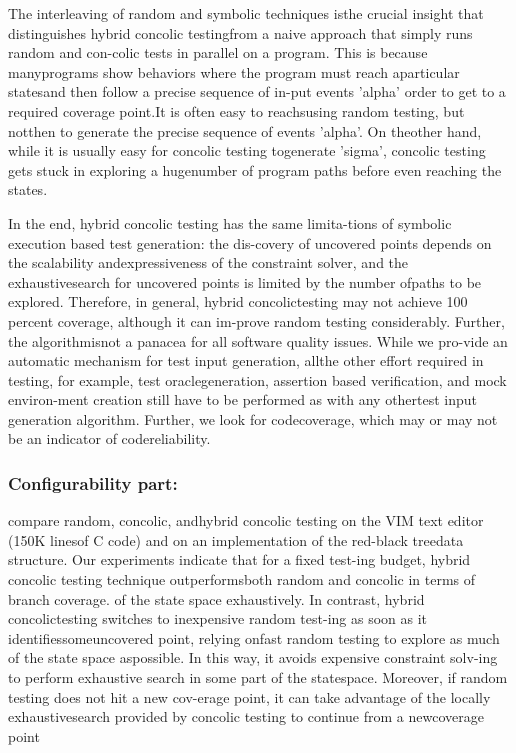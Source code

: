 \documentclass[	runningheads,
				a4paper]{llncs}
\begin{document}
The interleaving of random and symbolic techniques isthe crucial insight that distinguishes hybrid concolic testingfrom a naive approach that simply runs random and con-colic tests in parallel on a program.  This is because manyprograms show behaviors where the program must reach aparticular statesand then follow a precise sequence of in-put events 'alpha' order to get to a required coverage point.It  is  often  easy  to  reachsusing  random  testing,  but  notthen to generate the precise sequence of events 'alpha'.  On theother hand, while it is usually easy for concolic testing togenerate 'sigma', concolic testing gets stuck in exploring a hugenumber of program paths before even reaching the states.

In the end, hybrid concolic testing has the same limita-tions of symbolic execution based test generation:  the dis-covery of uncovered points depends on the scalability andexpressiveness of the constraint solver, and the exhaustivesearch  for  uncovered  points  is  limited  by  the  number  ofpaths to be explored. Therefore, in general, hybrid concolictesting may not achieve 100 percent coverage, although it can im-prove random testing considerably. Further, the algorithmisnot a panacea for all software quality issues. While we pro-vide an automatic mechanism for test input generation, allthe other effort required in testing, for example, test oraclegeneration, assertion based verification, and mock environ-ment creation still have to be performed as with any othertest input generation algorithm.  Further, we look for codecoverage,  which may or may not be an indicator of codereliability.

\subsubsection{Configurability part:}
compare random,  concolic,  andhybrid concolic testing on the VIM text editor (150K linesof C code) and on an implementation of the red-black treedata structure. Our experiments indicate that for a fixed test-ing budget, hybrid concolic testing technique outperformsboth random and concolic in terms of branch coverage. of the state space exhaustively. In contrast, hybrid concolictesting switches to inexpensive random test-ing as soon as it identifiessomeuncovered point, relying onfast random testing to explore as much of the state space aspossible.  In this way, it avoids expensive constraint solv-ing to perform exhaustive search in some part of the statespace. Moreover, if random testing does not hit a new cov-erage point, it can take advantage of the locally exhaustivesearch provided by concolic testing to continue from a newcoverage point
\end{document}
